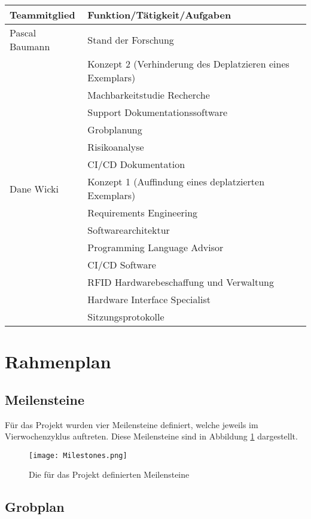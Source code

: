 \begin{tabularx}{\textwidth}{|l|X|}
	\hline
	\textbf{Teammitglied} & \textbf{Funktion/Tätigkeit/Aufgaben} \\
	\hline
	Pascal Baumann & Stand der Forschung \\
		& Konzept 2 (Verhinderung des Deplatzieren eines Exemplars) \\
		& Machbarkeitstudie Recherche \\
		& Support Dokumentationssoftware \\
		& Grobplanung \\
		& Risikoanalyse \\
		& CI/CD Dokumentation \\
	\hline
	Dane Wicki & Konzept 1 (Auffindung eines deplatzierten Exemplars)\\
		& Requirements Engineering \\
		& Softwarearchitektur \\
		& Programming Language Advisor \\
		& CI/CD Software \\
		& RFID Hardwarebeschaffung und Verwaltung \\
		& Hardware Interface Specialist \\
		& Sitzungsprotokolle \\
		
	\hline
\end{tabularx}

\section{Rahmenplan}
\subsection{Meilensteine}
\label{ssec:Meilensteine}
Für das Projekt wurden vier Meilensteine definiert, welche jeweils im Vierwochenzyklus auftreten. Diese Meilensteine sind in Abbildung \ref{fig:Milestones} dargestellt.

\begin{figure}[htb]
	\centering
	\texttt{[image: Milestones.png]}
	\caption{Die für das Projekt definierten Meilensteine}
	\label{fig:Milestones}
\end{figure}

\subsection{Grobplan}

